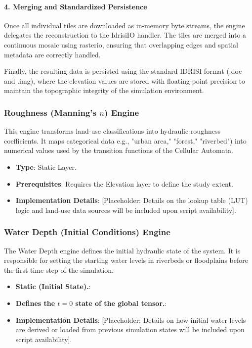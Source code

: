 \paragraph{4. Merging and Standardized Persistence}

Once all individual tiles are downloaded as in-memory byte streams, the engine delegates the reconstruction to the 
IdrisiIO handler. The tiles are merged into a continuous mosaic using rasterio, ensuring that overlapping edges and 
spatial metadata are correctly handled.

Finally, the resulting data is persisted using the standard IDRISI format (.doc and .img), where the elevation values 
are stored with floating-point precision to maintain the topographic integrity of the simulation environment.


\subsubsection{Roughness (Manning's $n$) Engine}

This engine transforms land-use classifications into hydraulic roughness coefficients. It maps categorical data 
e.g., "urban area," "forest," "riverbed") into numerical values used by the transition functions of the Cellular Automata.

\begin{itemize}
    \item \textbf{Type}: Static Layer.
    \item \textbf{Prerequisites}: Requires the Elevation layer to define the study extent.
    \item \textbf{Implementation Details}: [Placeholder: Details on the lookup table (LUT) logic and land-use data 
    sources will be included upon script availability].
\end{itemize}


\subsubsection{Water Depth (Initial Conditions) Engine}

The Water Depth engine defines the initial hydraulic state of the system. It is responsible for setting the starting 
water levels in riverbeds or floodplains before the first time step of the simulation.

\begin{itemize}
    \item \textbf{Static (Initial State).}: 
    \item \textbf{Defines the $t=0$ state of the global tensor.}: 
    \item \textbf{Implementation Details}: [Placeholder: Details on how initial water levels are derived or loaded from 
    previous simulation states will be included upon script availability].
\end{itemize}


